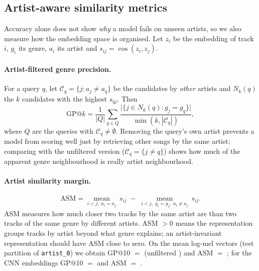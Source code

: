 
\subsection{Artist-aware similarity metrics}
\label{sec:similarity}

Accuracy alone does not show \emph{why} a model fails on unseen artists, so we
also measure how the embedding space is organised. Let \(z_i\) be the embedding
of track \(i\), \(g_i\) its genre, \(a_i\) its artist and
\(s_{ij} = \cos(z_i, z_j)\).

\paragraph{Artist-filtered genre precision.}
For a query \(q\), let \(\mathcal{C}_q = \{j : a_j \neq a_q\}\) be the
candidates by \emph{other} artists and \(N_k(q)\) the \(k\) candidates with the
highest \(s_{qj}\). Then
\begin{equation}
  \text{GP@}k = \frac{1}{|Q|}\sum_{q \in Q}
    \frac{\bigl|\{ j \in N_k(q) : g_j = g_q \}\bigr|}{\min(k, |\mathcal{C}_q|)},
  \label{eq:gpk}
\end{equation}
where \(Q\) are the queries with \(\mathcal{C}_q \neq \emptyset\). Removing the
query's own artist prevents a model from scoring well just by retrieving other
songs by the same artist; comparing with the unfiltered version
(\(\mathcal{C}_q = \{j \neq q\}\)) shows how much of the apparent genre
neighbourhood is really artist neighbourhood.

\paragraph{Artist similarity margin.}
\begin{equation}
  \text{ASM} =
  \underset{i<j,\; a_i = a_j}{\operatorname{mean}}\, s_{ij}
  \;-\;
  \underset{i<j,\; g_i = g_j,\; a_i \neq a_j}{\operatorname{mean}}\, s_{ij}.
  \label{eq:asm}
\end{equation}
ASM measures how much closer two tracks by the same artist are than two tracks
of the same genre by different artists. ASM \(>0\) means the representation
groups tracks by artist beyond what genre explains; an artist-invariant
representation should have ASM close to zero.
On the mean log-mel vectors (test partition of \texttt{artist\_0}) we obtain
GP@10 \(=\)  (unfiltered ) and ASM \(=\) ;
for the CNN embeddings GP@10 \(=\)  and ASM \(=\) .

